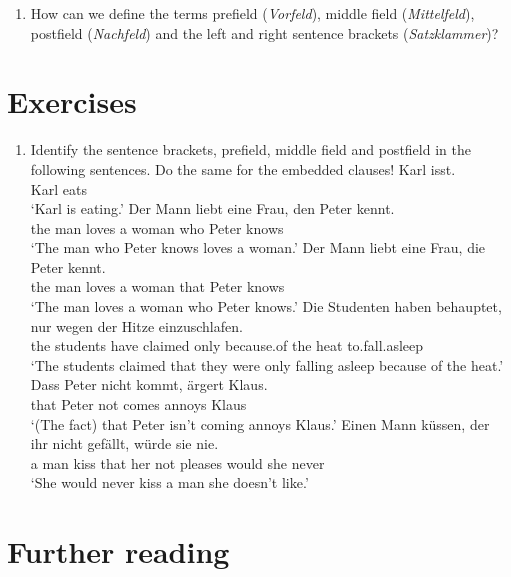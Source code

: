 {\begin{enumerate}
\item How can we define the terms prefield (\emph{Vorfeld}), middle field (\emph{Mittelfeld}), postfield (\emph{Nachfeld}) and the left
and right sentence brackets (\emph{Satzklammer})?
\end{enumerate}


\section*{Exercises}

\begin{enumerate}
\item Identify the sentence brackets, prefield, middle field and postfield in the following sentences. Do the same for the embedded clauses! 
\eal
\ex 
\gll Karl isst.\\
	 Karl eats\\
\glt `Karl is eating.'
\ex 
\gll Der Mann liebt eine Frau, den Peter kennt.\\
     the man  loves a woman who Peter knows\\
\glt `The man who Peter knows loves a woman.'
\ex 
\gll Der Mann liebt eine Frau, die Peter kennt.\\
	 the man loves a woman that Peter knows\\
\glt `The man loves a woman who Peter knows.'
\ex 
\gll Die Studenten haben behauptet, nur wegen der Hitze einzuschlafen.\\
	 the students have claimed only because.of the heat to.fall.asleep\\
\glt `The students claimed that they were only falling asleep because of the heat.'
\ex 
\gll Dass Peter nicht kommt, ärgert Klaus.\\
	 that Peter not comes annoys Klaus\\
\glt `(The fact) that Peter isn't coming annoys Klaus.'
\ex 
\gll Einen Mann küssen, der ihr nicht gefällt, würde sie nie.\\
	 a man kiss that her not pleases would she never\\
\glt `She would never kiss a man she doesn't like.'
\zl
\end{enumerate}


\section*{Further reading}

}
